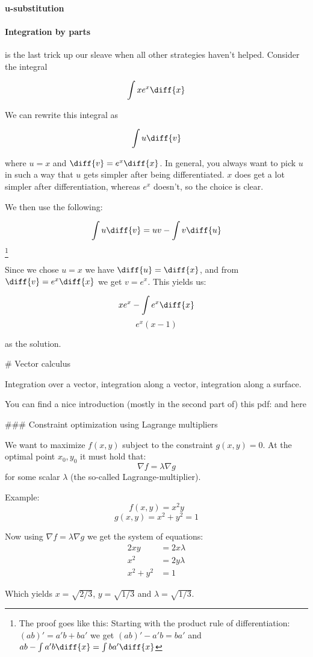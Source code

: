 \paragraph{u-substitution}

\paragraph{Integration by parts} is the last trick up our sleave when all other strategies haven't helped. Consider the integral 

$$ \int x e^x \diff{x} $$

We can rewrite this integral as 

$$ \int u \diff{v} $$

where $u = x$ and $\diff{v} = e^x \diff{x}$. In general, you always want to pick $u$ in such a way that $u$ gets simpler after being differentiated.
$x$ does get a lot simpler after differentiation, whereas $e^x$ doesn't, so the choice is clear. 

We then use the following: 

$$ \int u \diff{v} = uv - \int v \diff{u} $$\footnote{The proof goes like this: Starting with the product rule of differentiation: $(ab)' = a'b + ba'$ we get $(ab)' - a'b = ba'$ and  $ab - \int a'b \diff{x} = \int ba' \diff{x} $}

Since we chose $u = x$ we have $\diff{u} = \diff{x}$, and from $\diff{v} = e^x \diff{x}$ we get $v = e^x$. This yields us: 

$$ xe^x - \int e^x \diff{x} $$
$$ e^x ( x - 1) $$

as the solution. 

# Vector calculus

Integration over a vector, integration along a vector, integration along a surface. 

You can find a nice introduction (mostly in the second part of) this pdf:  and here 


### Constraint optimization using Lagrange multipliers

We want to maximize $f(x, y)$ subject to the constraint $g(x, y) = 0$.
At the optimal point $x_0, y_0$ it must hold that:
\begin{equation}
  \nabla f = \lambda \nabla g
\end{equation}
for some scalar $\lambda$ (the so-called Lagrange-multiplier).

Example:
$$ f(x, y) = x^2 y $$
$$ g(x, y) = x^2 + y^2 = 1 $$

Now using $\nabla f = \lambda \nabla g$ we get the system of equations:
\begin{equation}
    \begin{aligned}
        2xy &= 2x\lambda \\
        x^2 &= 2y\lambda \\
        x^2 + y^2 &= 1
    \end{aligned}
\end{equation}

Which yields $x = \sqrt{2/3}$, $y = \sqrt{1/3}$ and $\lambda = \sqrt{1/3}$.
